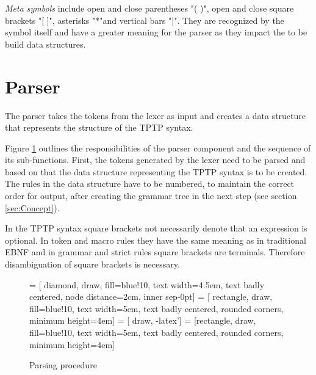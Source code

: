 \textit{Meta symbols} include open and close parentheses "( )", open and close square
brackets "[ ]", asterisks "*"and vertical bars "|".
They are recognized by the symbol itself and have a greater meaning for the parser as they impact the to be build data structures.



\section{Parser}\label{sec:ConceptParser}
The parser takes the tokens from the lexer as input and creates a data structure that represents the structure of the \ac{TPTP} syntax.

Figure \ref{fig:ConceptParserFlow} outlines the responsibilities of the parser component and the sequence of its sub-functions.
First, the tokens generated by the lexer need to be parsed and based on that the data structure representing the \ac{TPTP} syntax is to be created.
The rules in the data structure have to be numbered, to maintain the correct order for output, after creating the grammar tree in the next step (see section \ref{sec:Concept}).

In the \ac{TPTP} syntax square brackets not necessarily denote that an expression is optional.
In token and macro rules they have the same meaning as in traditional \ac{EBNF} and in grammar and strict rules square brackets are terminals. Therefore disambiguation of square brackets is necessary.
\begin{figure}[H]
 = [ diamond, draw, fill=blue!10, text width=4.5em, text badly centered, node distance=2cm, inner sep-0pt]  
 = [ rectangle, draw, fill=blue!10, text width=5em, text badly centered, rounded corners, minimum height=4em]  
 = [ draw, -latex']  
 = [rectangle, draw, fill=blue!10, text width=5em, text badly centered, rounded corners, minimum height=4em]  
\begin{center}
\end{center}
\caption{Parsing procedure}
\label{fig:ConceptParserFlow}
\end{figure}


